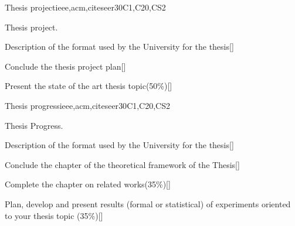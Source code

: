 \begin{syllabus}
\begin{unit}{Thesis project}{}{ieee,acm,citeseer}{30}{C1,C20,CS2}
   \begin{topics}
      \item Thesis project.	
   \end{topics}
   \begin{learningoutcomes}
      \item Description of the format used by the University for the thesis[\Assessment]
      \item Conclude the thesis project plan[\Assessment]
      \item Present the state of the art thesis topic(50\%)[\Assessment]
   \end{learningoutcomes}
\end{unit}

\begin{unit}{Thesis progress}{}{ieee,acm,citeseer}{30}{C1,C20,CS2}
   \begin{topics}
      \item Thesis Progress.
   \end{topics}
   \begin{learningoutcomes}
      \item Description of the format used by the University for the thesis[\Assessment]
      \item Conclude the chapter of the theoretical framework of the Thesis[\Assessment]
      \item Complete the chapter on related works(35\%)[\Assessment]
      \item Plan, develop and present results (formal or statistical) of experiments oriented to your thesis topic (35\%)[\Assessment]
   \end{learningoutcomes}
\end{unit}




\begin{coursebibliography}
\end{coursebibliography}
\end{syllabus}
